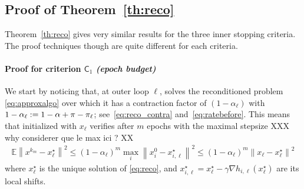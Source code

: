 \subsection{Proof of Theorem~\ref{th:reco}}

Theorem~\ref{th:reco} gives very similar results for the three inner stopping criteria. The proof techniques though are quite different for each criteria.

\vspace*{1ex}
\paragraph{Proof for criterion  $\mathsf{C}_1$ \emph{(epoch budget)} }

We start by noticing that, at outer loop $\ell$, \salgo solves the reconditioned problem \eqref{eq:approxalgo} over which it has a contraction factor of $(1-\alpha_\ell)$ with $1-\alpha_\ell  := 1-\alpha+\pi - \pi_\ell$;
see~\eqref{eq:reco_contra} and~\eqref{eq:ratebefore}.%
This means that \salgo initialized with $x_\ell$ verifies after $m$ epochs with the maximal stepsize XXX why considerer que le max ici ? XX
    \begin{align*}
             \mathbb{E}   \left\| x^{k_m} - x_\ell^\star \right\|^2 \le \left( 1-\alpha_\ell  \right)^{m} \max_i\left\|x_i^0-x_{i,\ell}^\star\right\|^2 \le \left( 1-\alpha_\ell  \right)^{m} \left\|x_\ell -x_{\ell}^\star\right\|^2
    \end{align*}
    where $x_\ell^\star$ is the unique solution of \eqref{eq:reco}, and $x_{i,\ell}^\star = x_\ell^\star - \gamma \nabla h_{i,\ell}(x^\star_\ell)$ are its local shifts.
    
